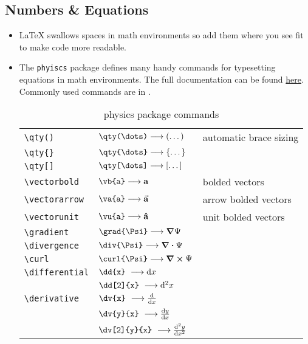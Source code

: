 \subsection{Numbers \& Equations}
\begin{itemize}
    \item \LaTeX{} swallows spaces in math environments so add them where you see fit to make code more readable.
    \item The \verb|phyiscs| package defines many handy commands for typesetting equations in math environments. The full documentation can be found \href{https://ctan.org/pkg/physics?lang=en}{here}. Commonly used commands are in .
    \begin{table*}
        \centering
        \caption{physics package commands}
        \label{tab:PhysicsCommands}
        \begin{tabular}{lll}
            \verb|\qty()| & $\verb|\qty(\dots)| \longrightarrow \qty(\dots)$ & automatic brace sizing \\
            \verb|\qty{}| & $\verb|\qty{\dots}| \longrightarrow \qty{\dots}$ & \\
            \verb|\qty[]| & $\verb|\qty[\dots]| \longrightarrow \qty[\dots]$ & \\
            \verb|\vectorbold| & $\verb|\vb{a}| \longrightarrow \vb{a}$ & bolded vectors \\
            \verb|\vectorarrow| & $\verb|\va{a}| \longrightarrow \va{a}$ & arrow bolded vectors \\
            \verb|\vectorunit| & $\verb|\vu{a}| \longrightarrow \vu{a}$ & unit bolded vectors \\
            \verb|\gradient| & $\verb|\grad{\Psi}| \longrightarrow \grad{\Psi}$ &  \\
            \verb|\divergence| & $\verb|\div{\Psi}| \longrightarrow \div{\Psi}$ &  \\
            \verb|\curl| & $\verb|\curl{\Psi}| \longrightarrow \curl{\Psi}$ &  \\
            \verb|\differential| & $\verb|\dd{x}|\ \longrightarrow \dd{x}$ & \\
            & $\verb|\dd[2]{x}|\ \longrightarrow \dd[2]{x}$ & \\
             \verb|\derivative| & $\verb|\dv{x}|\ \longrightarrow \dv{x}$ & \\
            & $\verb|\dv{y}{x}|\ \longrightarrow \dv{y}{x}$ & \\
            & $\verb|\dv[2]{y}{x}|\ \longrightarrow \dv[2]{y}{x}$ & \\

\end{tabular}
\end{table*}
\end{itemize}
